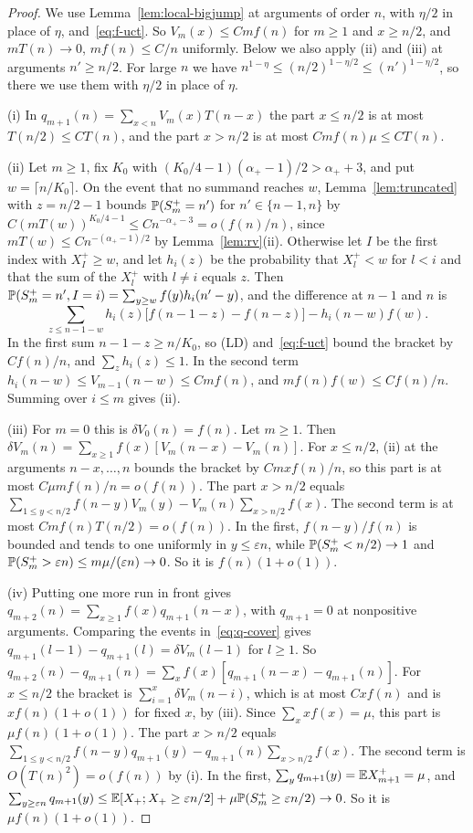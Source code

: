\begin{proof}
We use Lemma~\ref{lem:local-bigjump} at arguments of order $n$, with $\eta/2$ in place of
$\eta$, and~\eqref{eq:f-uct}. So $V_m(x)\le Cmf(n)$ for $m\ge1$ and $x\ge n/2$, and
$mT(n)\to0$, $mf(n)\le C/n$ uniformly. Below we also apply (ii) and (iii) at arguments
$n'\ge n/2$. For large $n$ we have $n^{1-\eta}\le(n/2)^{1-\eta/2}\le(n')^{1-\eta/2}$, so there
we use them with $\eta/2$ in place of $\eta$.

(i) In $q_{m+1}(n)=\sum_{x<n}V_m(x)T(n-x)$ the part $x\le n/2$ is at most $T(n/2)\le CT(n)$,
and the part $x>n/2$ is at most $Cmf(n)\mu\le CT(n)$.

(ii) Let $m\ge1$, fix $K_0$ with $(K_0/4-1)(\alpha_\plus-1)/2>\alpha_\plus+3$, and put
$w=\lceil n/K_0\rceil$. On the event that no summand reaches $w$,
Lemma~\ref{lem:truncated} with $z=n/2-1$ bounds $\mathbb{P}(S^{+}_m=n')$ for $n'\in\{n-1,n\}$ by
$C(mT(w))^{K_0/4-1}\le Cn^{-\alpha_\plus-3}=o(f(n)/n)$, since
$mT(w)\le Cn^{-(\alpha_\plus-1)/2}$ by Lemma~\ref{lem:rv}(ii). Otherwise let $I$ be the
first index with $X^\plus_I\ge w$, and let $h_i(z)$ be the probability that $X^\plus_l<w$
for $l<i$ and that the sum of the $X^\plus_l$ with $l\ne i$ equals $z$. Then
$\mathbb{P}(S^{+}_m=n',I=i)=\sum_{y\ge w}f(y)h_i(n'-y)$, and the difference at $n-1$ and $n$ is
\[
 \sum_{z\le n-1-w}h_i(z)\bigl[f(n-1-z)-f(n-z)\bigr]-h_i(n-w)f(w).
\]
In the first sum $n-1-z\ge n/K_0$, so (LD) and~\eqref{eq:f-uct} bound the bracket by
$Cf(n)/n$, and $\sum_zh_i(z)\le1$. In the second term $h_i(n-w)\le V_{m-1}(n-w)\le Cmf(n)$,
and $mf(n)f(w)\le Cf(n)/n$. Summing over $i\le m$ gives (ii).

(iii) For $m=0$ this is $\delta V_0(n)=f(n)$. Let $m\ge1$. Then
$\delta V_m(n)=\sum_{x\ge1}f(x)[V_m(n-x)-V_m(n)]$. For $x\le n/2$, (ii) at the arguments
$n-x,\dots,n$ bounds the bracket by $Cmxf(n)/n$, so this part is at most
$C\mu mf(n)/n=o(f(n))$. The part $x>n/2$ equals
$\sum_{1\le y<n/2}f(n-y)V_m(y)-V_m(n)\sum_{x>n/2}f(x)$. The second term is at most
$Cmf(n)T(n/2)=o(f(n))$. In the first, $f(n-y)/f(n)$ is bounded and tends to one uniformly
in $y\le\varepsilon n$, while $\mathbb{P}(S^{+}_m<n/2)\to1$ and
$\mathbb{P}(S^{+}_m>\varepsilon n)\le m\mu/(\varepsilon n)\to0$. So it is $f(n)(1+o(1))$.

(iv) Putting one more run in front gives $q_{m+2}(n)=\sum_{x\ge1}f(x)q_{m+1}(n-x)$, with
$q_{m+1}=0$ at nonpositive arguments. Comparing the events in~\eqref{eq:q-cover} gives
$q_{m+1}(l-1)-q_{m+1}(l)=\delta V_m(l-1)$ for $l\ge1$. So
$q_{m+2}(n)-q_{m+1}(n)=\sum_xf(x)[q_{m+1}(n-x)-q_{m+1}(n)]$. For $x\le n/2$ the bracket is
$\sum_{i=1}^x\delta V_m(n-i)$, which is at most $Cxf(n)$ and is $xf(n)(1+o(1))$ for fixed
$x$, by (iii). Since $\sum_xxf(x)=\mu$, this part is $\mu f(n)(1+o(1))$. The part $x>n/2$
equals $\sum_{1\le y<n/2}f(n-y)q_{m+1}(y)-q_{m+1}(n)\sum_{x>n/2}f(x)$. The second term is
$O(T(n)^2)=o(f(n))$ by (i). In the first, $\sum_yq_{m+1}(y)=\mathbb{E} X^{+}_{m+1}=\mu$, and
$\sum_{y\ge\varepsilon n}q_{m+1}(y)\le\mathbb{E}[X_{+};X_{+}\ge\varepsilon n/2]+\mu\mathbb{P}(S^{+}_m\ge\varepsilon n/2)\to0$.
So it is $\mu f(n)(1+o(1))$.
\end{proof}

